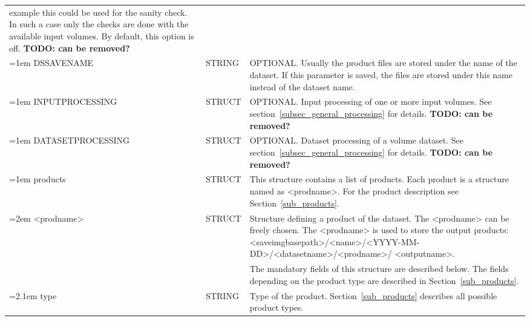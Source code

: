 \documentclass[a4paper,11pt,pdftex,twoside]{scrartcl}
\renewcommand{\bf}{\normalfont \bfseries}
\begin{document}
{{{\begin{longtable}{p{}p{}p{}}
                                 example this could be used for the sanity check. In such a case
                                 only the checks are done with the available input volumes.
                                 By default, this option is off. {\bf TODO: can be removed?}\\
\hangindent=1em \hangafter=0
        DSSAVENAME & STRING   &  OPTIONAL. Usually the product files are stored under the name of the
                                 dataset. If this parameter is saved, the files are stored under
                                 this name instead of the dataset name.\\
\hangindent=1em \hangafter=0
        INPUT\-PROCESSING & STRUCT & OPTIONAL. Input processing of one or more input volumes. See
                                 section~\ref{subsec_general_processing} for details. {\bf TODO: can be removed?}\\
\hangindent=1em \hangafter=0
        DATASET\-PROCESSING & STRUCT & OPTIONAL. Dataset processing of a volume dataset. See
                                 section~\ref{subsec_general_processing} for details. {\bf TODO: can be removed?}\\
\hangindent=1em \hangafter=0
        products   & STRUCT    & This structure contains a list of products. Each product
                                 is a structure named as <prodname>. For the product
                                 description see Section~\ref{sub_products}.\\
\hangindent=2em \hangafter=0
        <prodname> & STRUCT    & Structure defining a product of the dataset.
                                 The <prodname> can be freely chosen. The <prodname> is
                                 used to store the output products:
                                 <saveimgbasepath>/<name>/<YYYY-MM-DD>/<datasetname>/<prodname>/
                                 <outputname>.\\
                   &           & The mandatory fields of this structure are described below.
                                 The fields depending on the product type are described in
                                 Section~\ref{sub_products}.\\
\hangindent=2.1em \hangafter=0
         type      & STRING    & Type of the product. Section~\ref{sub_products} describes all possible
                                 product types.\\
\end{longtable}

}}}
\end{document}
